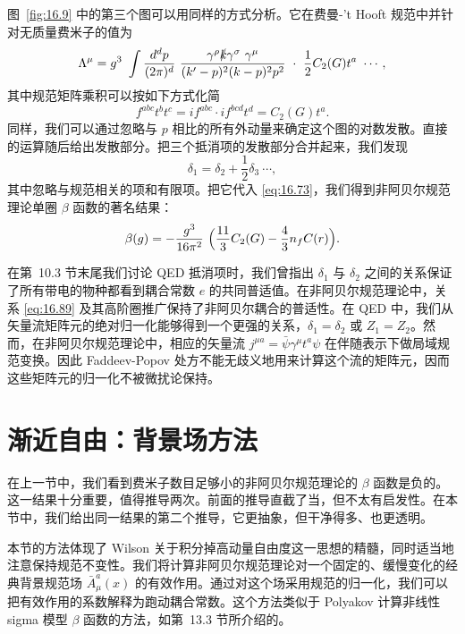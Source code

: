 图~\ref{fig:16.9} 中的第三个图可以用同样的方式分析。它在费曼-'t Hooft 规范中并针对无质量费米子的值为
\begin{equation}
  \Lambda^\mu = g^3\ \int \frac{d^dp}{(2\pi)^d}\ \frac{\gamma^\rho
    \slashed{k}\gamma^\sigma\ \gamma^\mu }{(k'-p)^2(k-p)^2p^2}\ \cdot\
    \frac{1}{2}C_2(G)t^a\ \cdots ,
  \label{eq:16.82}
\end{equation}
其中规范矩阵乘积可以按如下方式化简
\begin{equation}
  f^{abc}t^bt^c = if^{abc}\cdot if^{bcd}t^d = C_2(G)t^a .
\end{equation}
同样，我们可以通过忽略与 $p$ 相比的所有外动量来确定这个图的对数发散。直接的运算随后给出发散部分。把三个抵消项的发散部分合并起来，我们发现
\begin{equation}
  \delta_1 = \delta_2 + \frac{1}{2}\delta_3\ \cdots ,
  \label{eq:16.89}
\end{equation}
其中忽略与规范相关的项和有限项。把它代入 \eqref{eq:16.73}，我们得到非阿贝尔规范理论单圈 $\beta$ 函数的著名结果：
\begin{equation}
  \beta(g) = -\frac{g^3}{16\pi^2}\ \Bigl( \frac{11}{3}C_2(G)
    - \frac{4}{3}n_fC(r) \Bigr) .
  \label{eq:16.90}
\end{equation}

在第~10.3 节末尾我们讨论 QED 抵消项时，我们曾指出 $\delta_1$ 与 $\delta_2$ 之间的关系保证了所有带电的物种都看到耦合常数 $e$ 的共同普适值。在非阿贝尔规范理论中，关系 \eqref{eq:16.89} 及其高阶圈推广保持了非阿贝尔耦合的普适性。在 QED 中，我们从矢量流矩阵元的绝对归一化能够得到一个更强的关系，$\delta_1 = \delta_2$ 或 $Z_1 = Z_2$。然而，在非阿贝尔规范理论中，相应的矢量流 $j^{\mu a} = \bar{\psi}\gamma^\mu t^a\psi$ 在伴随表示下做局域规范变换。因此 Faddeev-Popov 处方不能无歧义地用来计算这个流的矩阵元，因而这些矩阵元的归一化不被微扰论保持。

\section{渐近自由：背景场方法}

在上一节中，我们看到费米子数目足够小的非阿贝尔规范理论的 $\beta$ 函数是负的。这一结果十分重要，值得推导两次。前面的推导直截了当，但不太有启发性。在本节中，我们给出同一结果的第二个推导，它更抽象，但干净得多、也更透明。

本节的方法体现了 Wilson 关于积分掉高动量自由度这一思想的精髓，同时适当地注意保持规范不变性。我们将计算非阿贝尔规范理论对一个固定的、缓慢变化的经典背景规范场 $\bar{A}^a_\mu(x)$ 的有效作用。通过对这个场采用规范的归一化，我们可以把有效作用的系数解释为跑动耦合常数。这个方法类似于 Polyakov 计算非线性 sigma 模型 $\beta$ 函数的方法，如第~13.3 节所介绍的。

